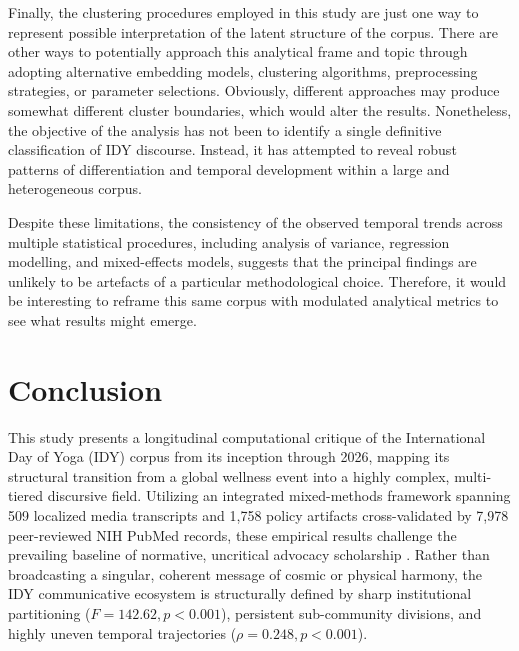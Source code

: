 \documentclass[11pt]{article}
\begin{document}
Finally, the clustering procedures employed in this study are just one way to represent possible interpretation of the latent structure of the corpus. There are other ways to potentially approach this analytical frame and topic through adopting alternative embedding models, clustering algorithms, preprocessing strategies, or parameter selections. Obviously, different approaches may produce somewhat different cluster boundaries, which would alter the results. Nonetheless, the objective of the analysis has not been to identify a single definitive classification of IDY discourse. Instead, it has attempted to reveal robust patterns of differentiation and temporal development within a large and heterogeneous corpus.

Despite these limitations, the consistency of the observed temporal trends across multiple statistical procedures, including analysis of variance, regression modelling, and mixed-effects models, suggests that the principal findings are unlikely to be artefacts of a particular methodological choice. Therefore, it would be interesting to reframe this same corpus with modulated analytical metrics to see what results might emerge.

\section{Conclusion}
This study presents a longitudinal computational critique of the International Day of Yoga (IDY) corpus from its inception through 2026, mapping its structural transition from a global wellness event into a highly complex, multi-tiered discursive field. Utilizing an integrated mixed-methods framework spanning 509 localized media transcripts and 1,758 policy artifacts cross-validated by 7,978 peer-reviewed NIH PubMed records, these empirical results challenge the prevailing baseline of normative, uncritical advocacy scholarship \cite{kamal2024yoga,sadineni2024reimagining}. Rather than broadcasting a singular, coherent message of cosmic or physical harmony, the IDY communicative ecosystem is structurally defined by sharp institutional partitioning ($F = 142.62, p < 0.001$), persistent sub-community divisions, and highly uneven temporal trajectories ($\rho = 0.248, p < 0.001$). 
\end{document}
